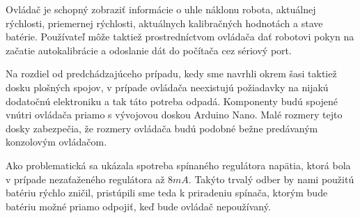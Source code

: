 Ovládač je schopný zobraziť informácie o uhle náklonu robota, aktuálnej rýchlosti, priemernej rýchlosti, aktuálnych kalibračných hodnotách a stave batérie. Používateľ môže taktiež prostredníctvom ovládača dať robotovi pokyn na začatie autokalibrácie a odoslanie dát do počítača cez sériový port.

Na rozdiel od predchádzajúceho prípadu, kedy sme navrhli okrem šasi taktiež dosku plošných spojov, v prípade ovládača neexistujú požiadavky na nijakú dodatočnú elektroniku a tak táto potreba odpadá. Komponenty budú spojené vnútri ovládača priamo s vývojovou doskou Arduino Nano. Malé rozmery tejto dosky zabezpečia, že rozmery ovládača budú podobné bežne predávaným konzolovým ovládačom. 

Ako problematická sa ukázala spotreba spínaného regulátora napätia, ktorá  bola v prípade nezaťaženého regulátora až $8 mA$. Takýto trvalý odber by nami použitú batériu rýchlo zničil, pristúpili sme teda k priradeniu spínača, ktorým bude batériu možné priamo odpojiť, keď bude ovládač nepoužívaný.

